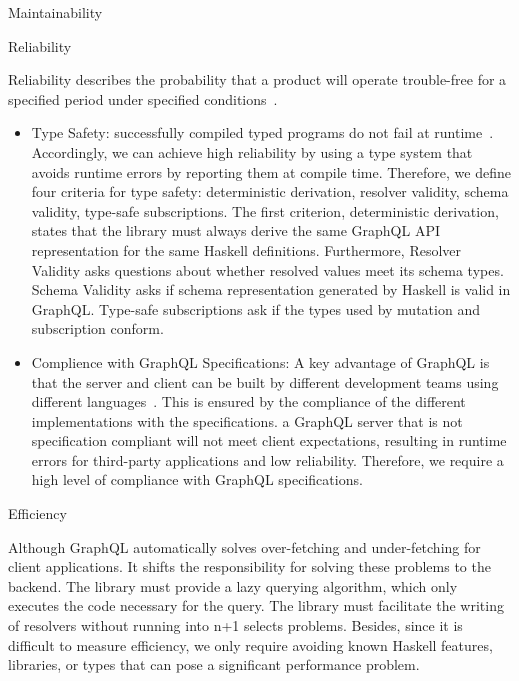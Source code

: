 \begin{frame}
\begin{alertblock}{Maintainability}
\begin{itemize}
\end{itemize}

\end{alertblock}

\begin{alertblock}{Reliability}

Reliability describes the probability that a product will operate trouble-free for a specified period under specified conditions~\cite{optimal-release-time}.

\begin{itemize}
    \item Type Safety: successfully compiled typed programs do not fail at runtime~\cite{milner-well-typed,wadler-well-typed}.  Accordingly, we can achieve high reliability by using a type system that avoids runtime errors by reporting them at compile time. Therefore, we define four criteria for type safety: deterministic derivation, resolver validity, schema validity, type-safe subscriptions.  
    The first criterion, deterministic derivation, states that the library must always derive the same GraphQL API representation for the same Haskell definitions. 
    Furthermore, Resolver Validity asks questions 
    about whether resolved values meet its schema types. 
    Schema Validity asks if schema representation generated by Haskell is valid in GraphQL. Type-safe subscriptions ask if the types used by mutation and subscription conform.
    \item Complience with GraphQL Specifications:
    A key advantage of GraphQL is that the server and client can be built by different development teams using different languages~\cite{gql-healthcare}. 
    This is ensured by the compliance of the different implementations with the specifications. a GraphQL server that is not specification compliant will not meet client expectations, resulting in runtime errors for third-party applications and low reliability. Therefore, we require a high level of compliance with GraphQL specifications.
\end{itemize}

\end{alertblock}


\begin{alertblock}{Efficiency} 
  
Although GraphQL automatically solves over-fetching and under-fetching for client applications. 
It shifts the responsibility for solving these problems to the backend.  
The library must provide a lazy querying algorithm, which only executes the code necessary for the query. 
The library must facilitate the writing of resolvers 
without running into n+1 selects 
problems. Besides, since it is difficult to measure efficiency, we only require avoiding known Haskell features, libraries, or types that can pose a significant performance problem.

\end{alertblock}

\end{frame}